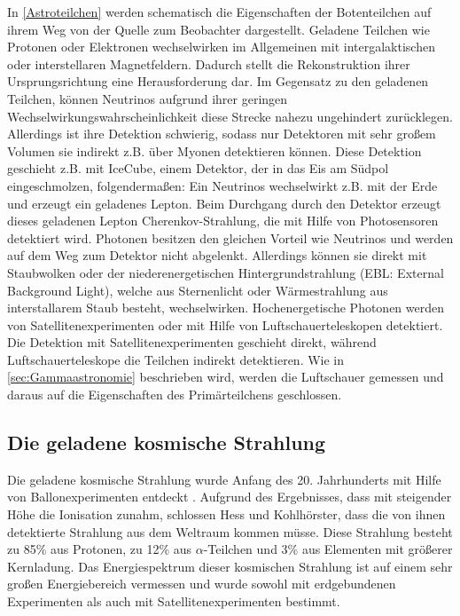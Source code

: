 In \autoref{Astroteilchen} werden schematisch die Eigenschaften der Botenteilchen auf ihrem Weg von der Quelle zum Beobachter dargestellt.
Geladene Teilchen wie Protonen oder Elektronen wechselwirken im Allgemeinen mit intergalaktischen oder interstellaren Magnetfeldern.
Dadurch stellt die Rekonstruktion ihrer Ursprungsrichtung eine Herausforderung dar.
Im Gegensatz zu den geladenen Teilchen, können Neutrinos aufgrund ihrer geringen Wechselwirkungswahrscheinlichkeit diese Strecke nahezu ungehindert zurücklegen. 
Allerdings ist ihre Detektion schwierig, sodass nur Detektoren mit sehr großem Volumen sie indirekt z.B. über Myonen detektieren können.
Diese Detektion geschieht z.B. mit IceCube, einem Detektor, der in das Eis am Südpol eingeschmolzen, folgendermaßen:
Ein Neutrinos wechselwirkt z.B. mit der Erde und erzeugt ein geladenes Lepton. 
Beim Durchgang durch den Detektor erzeugt dieses geladenen Lepton Cherenkov-Strahlung, die mit Hilfe von Photosensoren detektiert wird.
Photonen besitzen den gleichen Vorteil wie Neutrinos und werden auf dem Weg zum Detektor nicht abgelenkt.
Allerdings können sie direkt mit Staubwolken oder der niederenergetischen Hintergrundstrahlung (EBL: External Background Light), welche aus Sternenlicht oder Wärmestrahlung aus interstallarem Staub besteht, wechselwirken.
Hochenergetische Photonen werden von Satellitenexperimenten oder mit Hilfe von Luftschauerteleskopen detektiert.
Die Detektion mit Satellitenexperimenten geschieht direkt, während Luftschauerteleskope die Teilchen indirekt detektieren.
Wie in \autoref{sec:Gammaastronomie} beschrieben wird, werden die Luftschauer gemessen und daraus auf die Eigenschaften des Primärteilchens geschlossen.


\subsection{Die geladene kosmische Strahlung}
Die geladene kosmische Strahlung wurde Anfang des 20. Jahrhunderts mit Hilfe von Ballonexperimenten entdeckt \cite{Hess}.
Aufgrund des Ergebnisses, dass mit steigender Höhe die Ionisation zunahm, schlossen Hess und Kohlhörster\cite{Kohlhoerster}, dass die von ihnen detektierte Strahlung aus dem Weltraum kommen müsse.
Diese Strahlung besteht zu 85\%\cite{Grupen} aus Protonen, zu 12\%\cite{Grupen} aus $\alpha$-Teilchen und 3\%\cite{Grupen} aus Elementen mit größerer Kernladung.
Das Energiespektrum dieser kosmischen Strahlung ist auf einem sehr großen Energiebereich vermessen und wurde sowohl mit erdgebundenen Experimenten als auch mit Satellitenexperimenten bestimmt.


